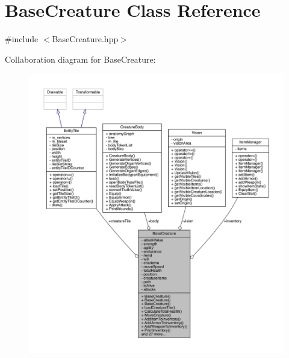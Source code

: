 \hypertarget{class_base_creature}{}\section{Base\+Creature Class Reference}
\label{class_base_creature}


{\ttfamily \#include $<$Base\+Creature.\+hpp$>$}



Collaboration diagram for Base\+Creature\+:
\nopagebreak
\begin{figure}[H]
\begin{center}
\leavevmode
\includegraphics[width=350pt]{d9/d23/class_base_creature__coll__graph}
\end{center}
\end{figure}
